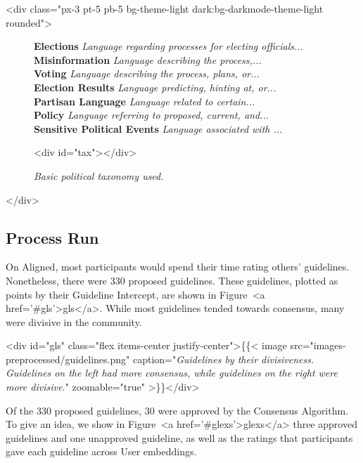 \documentclass{article}
\begin{document}
\begin{multicols}{2}
<div class="px-3 pt-5 pb-5 bg-theme-light dark:bg-darkmode-theme-light rounded">\begin{figure}[H]
\begin{mdframed}
\footnotesize
\textbf{Elections} \textit{Language regarding processes for electing officials...}\\
\hspace*{1em} \textbf{Misinformation} \textit{Language describing the process,...}\\
\hspace*{1em} \textbf{Voting} \textit{Language describing the process, plans, or...} \\
\hspace*{1em} \textbf{Election Results} \textit{Language predicting, hinting at, or...}\\
\textbf{Partisan Language} \textit{Language related to certain...}\\
\textbf{Policy} \textit{Language referring to proposed, current, and...}\\
\textbf{Sensitive Political Events} \textit{Language associated with ...}
\end{mdframed}
\caption{\textit{Basic political taxonomy used.}}
<div id="tax"></div>

\end{figure}</div>
\vspace{-5pt}

\subsection{Process Run}

On Aligned, most participants would spend their time rating others' guidelines. Nonetheless, there were 330 proposed guidelines. These guidelines, plotted as points by their Guideline Intercept, are shown in Figure~<a href='#gls'>gls</a>. While most guidelines tended towards consensus, many were divisive in the community.

<div id="gls" class="flex items-center justify-center">\{\{< image src="images-preprocessed/guidelines.png" caption="\textit{Guidelines by their divisiveness. Guidelines on the left had more consensus, while guidelines on the right were more divisive.}" zoomable="true" >\}\}</div>


\vspace{-5pt}

Of the 330 proposed guidelines, 30 were approved by the Consensus Algorithm. To give an idea, we show in Figure~<a href='#glexs'>glexs</a> three approved guidelines and one unapproved guideline, as well as the ratings that participants gave each guideline across User embeddings.


\end{multicols}
\end{document}

